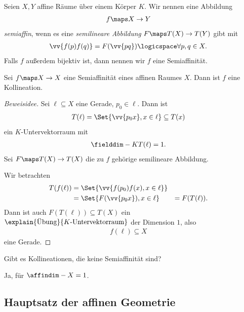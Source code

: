 \begin{definition*}
    Seien \( X,Y \) affine Räume über einem Körper \( K \). Wir nennen eine Abbildung
    \begin{align*}
        f\maps X\to Y
    \end{align*}
    \emph{semiaffin}, wenn es eine \emph{semilineare Abbildung} \( F\maps T(X)\to T(Y) \) gibt mit
    \begin{align*}
        \vv{f(p) f(q)}=F(\vv{pq})\logicspace \forall p,q\in X.
    \end{align*}
    Falls \( f \) außerdem bijektiv ist, dann nennen wir \( f \) eine Semiaffinität.
\end{definition*}
\begin{lemma}
    Sei \( f\maps X\to X \) eine Semiaffinität eines affinen Raumes \( X \). Dann ist \( f \) eine Kollineation.
\end{lemma}
\begin{proof}[Beweisidee]
    Sei \( \ell \subseteq X \) eine Gerade, \( p_0\in \ell \). Dann ist
    \begin{align*}
        T(\ell)=\Set{\vv{p_0 x}, x\in \ell}\subseteq T(x)
    \end{align*}
    ein \( K \)-Untervektorraum mit
    \begin{align*}
        \fielddim-{K}{T(\ell)}=1.
    \end{align*}
    Sei \( F\maps T(X)\to T(X)  \) die zu \( f \) gehörige semilineare Abbildung.

    Wir betrachten 
    \begin{align*}
        T(f(\ell))
        \begin{aligned}[t]
            &=\Set{\vv{f(p_0) f(x), x\in \ell}}\\
            &=\Set{F(\vv{p_0 x}), x\in \ell}
            &=F(T(\ell)).
        \end{aligned}        
    \end{align*}
    Dann ist auch \( F(T(\ell))\subseteq T(X) \) ein \( \explain{\text{Übung}}{K \text{-Untervektorraum}} \) der Dimension \( 1 \), also
    \begin{align*}
        f(\ell)\subseteq X
    \end{align*}
    eine Gerade.
\end{proof}
\begin{frage*}
    Gibt es Kollineationen, die keine Semiaffinität sind?
\end{frage*}
\tto Ja, \zb für \( \affindim-{X}=1 \).
\subsection*{Hauptsatz der affinen Geometrie}

